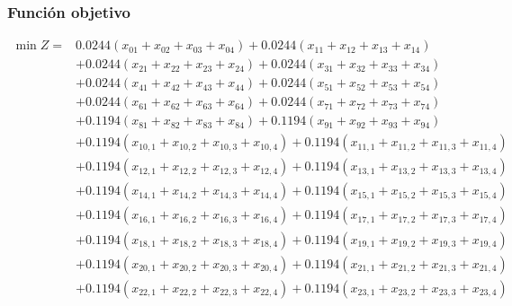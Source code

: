 \documentclass[12pt,a4paper]{article}
\begin{document}
\subsubsection*{Función objetivo}
\[
\begin{aligned}
\min Z ={}& 0.0244(x_{01}+x_{02}+x_{03}+x_{04}) + 0.0244(x_{11}+x_{12}+x_{13}+x_{14}) \\
&+ 0.0244(x_{21}+x_{22}+x_{23}+x_{24}) + 0.0244(x_{31}+x_{32}+x_{33}+x_{34}) \\
&+ 0.0244(x_{41}+x_{42}+x_{43}+x_{44}) + 0.0244(x_{51}+x_{52}+x_{53}+x_{54}) \\
&+ 0.0244(x_{61}+x_{62}+x_{63}+x_{64}) + 0.0244(x_{71}+x_{72}+x_{73}+x_{74}) \\
&+ 0.1194(x_{81}+x_{82}+x_{83}+x_{84}) + 0.1194(x_{91}+x_{92}+x_{93}+x_{94}) \\
&+ 0.1194(x_{10,1}+x_{10,2}+x_{10,3}+x_{10,4}) + 0.1194(x_{11,1}+x_{11,2}+x_{11,3}+x_{11,4}) \\
&+ 0.1194(x_{12,1}+x_{12,2}+x_{12,3}+x_{12,4}) + 0.1194(x_{13,1}+x_{13,2}+x_{13,3}+x_{13,4}) \\
&+ 0.1194(x_{14,1}+x_{14,2}+x_{14,3}+x_{14,4}) + 0.1194(x_{15,1}+x_{15,2}+x_{15,3}+x_{15,4}) \\
&+ 0.1194(x_{16,1}+x_{16,2}+x_{16,3}+x_{16,4}) + 0.1194(x_{17,1}+x_{17,2}+x_{17,3}+x_{17,4}) \\
&+ 0.1194(x_{18,1}+x_{18,2}+x_{18,3}+x_{18,4}) + 0.1194(x_{19,1}+x_{19,2}+x_{19,3}+x_{19,4}) \\
&+ 0.1194(x_{20,1}+x_{20,2}+x_{20,3}+x_{20,4}) + 0.1194(x_{21,1}+x_{21,2}+x_{21,3}+x_{21,4}) \\
&+ 0.1194(x_{22,1}+x_{22,2}+x_{22,3}+x_{22,4}) + 0.1194(x_{23,1}+x_{23,2}+x_{23,3}+x_{23,4})
\end{aligned}
\]
\end{document}

